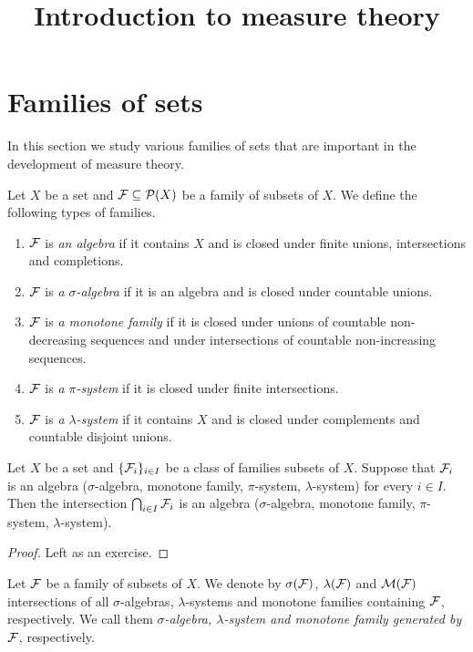 



\title{Introduction to measure theory}
\date{}
\maketitle

\section{Families of sets}
\noindent
In this section we study various families of sets that are important in the development of measure theory.

\begin{definition}
Let $X$ be a set and ${\mathcal F}\subseteq {\mathcal P}(X)$ be a family of subsets of $X$. We define the following types of families.
\begin{enumerate}[label=\textbf{(\arabic*)}, leftmargin=*]
\item ${\mathcal F}$ is \textit{an algebra} if it contains $X$ and is closed under finite unions, intersections and completions. 
\item ${\mathcal F}$ is \textit{a $\sigma$-algebra} if it is an algebra and is closed under countable unions.
\item ${\mathcal F}$ is \textit{a monotone family} if it is closed under unions of countable non-decreasing sequences and under intersections of countable non-increasing sequences.
\item ${\mathcal F}$ is \textit{a $\pi$-system} if it is closed under finite intersections.
\item ${\mathcal F}$ is \textit{a $\lambda$-system} if it contains $X$ and is closed under complements and countable disjoint unions. 
\end{enumerate}
\end{definition}

\begin{fact}\label{intersections}
Let $X$ be a set and $\{{\mathcal F}_i\}_{i\in I}$ be a class of families subsets of $X$. Suppose that ${\mathcal F}_i$ is an algebra ($\sigma$-algebra, monotone family, $\pi$-system, $\lambda$-system) for every $i\in I$. Then the intersection $\bigcap_{i\in I}{\mathcal F}_i$
is an algebra ($\sigma$-algebra, monotone family, $\pi$-system, $\lambda$-system).
\end{fact}
\begin{proof}
Left as an exercise.
\end{proof}

\begin{definition}
Let ${\mathcal F}$ be a family of subsets of $X$. We denote by $\sigma({\mathcal F})$, $\lambda({\mathcal F})$ and ${\mathcal M}({\mathcal F})$ intersections of all $\sigma$-algebras, $\lambda$-systems and monotone families containing ${\mathcal F}$, respectively. We call them \textit{$\sigma$-algebra, $\lambda$-system and monotone family generated by ${\mathcal F}$}, respectively. 
\end{definition}

